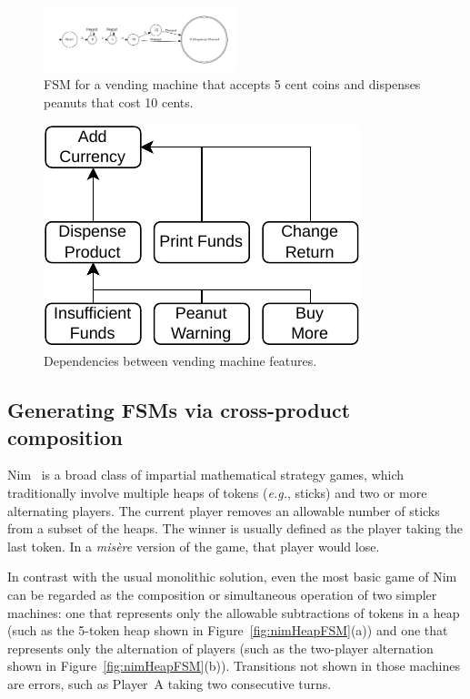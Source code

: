 \documentclass[conference]{IEEEtran}
\begin{document}
\begin{figure}
    \centering
    \includegraphics[width=0.5\textwidth]{figures/vend1.pdf}
    \caption{FSM for a vending machine that accepts 5 cent coins and dispenses peanuts that cost 10 cents.}
    \label{fig:vend1}
\end{figure}

\begin{figure}
    \centering
    \includegraphics[width=0.4\linewidth]{figures/VendingMachine.pdf}
    \caption{Dependencies between vending machine features.}
    \label{fig:vmDependencies}
\end{figure}

\subsection{Generating FSMs via cross-product composition}\label{sec:nim}

Nim~\cite{enwiki:1102668015} is a broad class of impartial mathematical strategy games, which traditionally involve multiple heaps of tokens (\emph{e.g.}, sticks) and two or more alternating players. The current player removes an allowable number of sticks from a subset of the heaps. The winner is usually defined as the player taking the last token. In a \emph{mis\`{e}re} version of the game, that player would lose.

In contrast with the usual monolithic solution, even the most basic game of Nim can be regarded as the composition or simultaneous operation of two simpler machines:   one that represents only the allowable subtractions of tokens in a heap (such as the 5-token heap shown in Figure~\ref{fig:nimHeapFSM}(a)) and one that represents only the alternation of players (such as the two-player alternation shown in Figure~\ref{fig:nimHeapFSM}(b)).  Transitions not shown in those machines are errors, such as Player~A taking two consecutive turns.  
\end{document}

